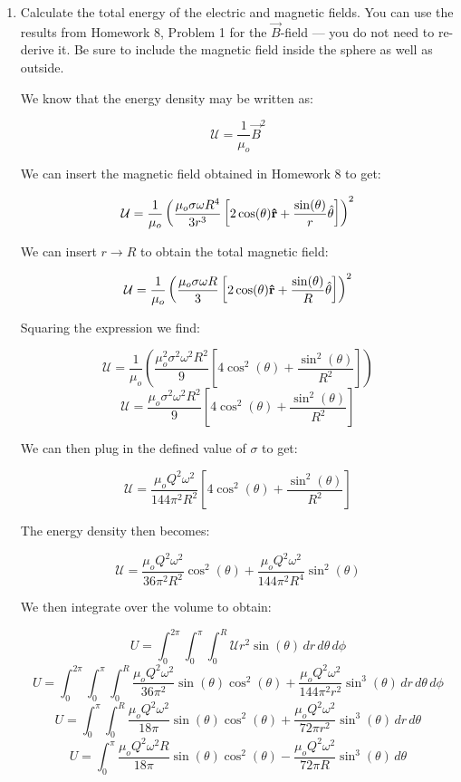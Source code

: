 \begin{enumerate}
    \begin{enumerate}

      \item Calculate the total energy of the electric and magnetic fields. You can use the results from Homework 8, Problem 1 for the $\vec{B}$-field — you do not need to re-derive it.  Be sure to include the magnetic field inside the sphere as well as outside.

        We know that the energy density may be written as:

        $$\mathcal{U}=\frac{1}{\mu_o}\vec{B}^2$$

        We can insert the magnetic field obtained in Homework 8 to get:

        $$\mathcal{U}=\frac{1}{\mu_o}\left( \frac{\mu_o\sigma\omega R^4}{3r^3}\left[ 2\cos(\theta)\bold{\hat{r}}+\frac{\sin(\theta)}{r}\hat{\theta} \right] \right)^2$$

        We can insert $r\to R$ to obtain the total magnetic field:

        $$\mathcal{U}=\frac{1}{\mu_o}\left( \frac{\mu_o\sigma\omega R}{3}\left[ 2\cos(\theta)\bold{\hat{r}}+\frac{\sin(\theta)}{R}\hat{\theta} \right] \right)^2$$

        Squaring the expression we find:

        $$\mathcal{U}=\frac{1}{\mu_o}\left( \frac{\mu_o^2\sigma^2\omega^2 R^2}{9}\left[ 4\cos^2(\theta)+\frac{\sin^2(\theta)}{R^2} \right] \right)$$
        $$\mathcal{U}=\frac{\mu_o\sigma^2\omega^2 R^2}{9}\left[ 4\cos^2(\theta)+\frac{\sin^2(\theta)}{R^2} \right]$$

        We can then plug in the defined value of $\sigma$ to get:

        $$\mathcal{U}=\frac{\mu_oQ^2\omega^2}{144\pi^2R^2}\left[ 4\cos^2(\theta)+\frac{\sin^2(\theta)}{R^2} \right]$$

        The energy density then becomes:

        $$\mathcal{U}=\frac{\mu_oQ^2\omega^2}{36\pi^2R^2}\cos^2(\theta)+\frac{\mu_oQ^2\omega^2}{144\pi^2R^4}\sin^2(\theta)$$

        We then integrate over the volume to obtain:

        $$U=\int_0^{2\pi}\int_0^\pi\int_0^R \mathcal{U} r^2\sin(\theta)\,dr\,d\theta\,d\phi$$
        $$U=\int_0^{2\pi}\int_0^\pi\int_0^R \frac{\mu_oQ^2\omega^2}{36\pi^2}\sin(\theta)\cos^2(\theta)+\frac{\mu_oQ^2\omega^2}{144\pi^2r^2}\sin^3(\theta)\,dr\,d\theta\,d\phi$$
        $$U=\int_0^\pi\int_0^R \frac{\mu_oQ^2\omega^2}{18\pi}\sin(\theta)\cos^2(\theta)+\frac{\mu_oQ^2\omega^2}{72\pi r^2}\sin^3(\theta)\,dr\,d\theta$$
        $$U=\int_0^\pi \frac{\mu_oQ^2\omega^2R}{18\pi}\sin(\theta)\cos^2(\theta)-\frac{\mu_oQ^2\omega^2}{72\pi R}\sin^3(\theta)\,d\theta$$


\end{enumerate}
\end{enumerate}
